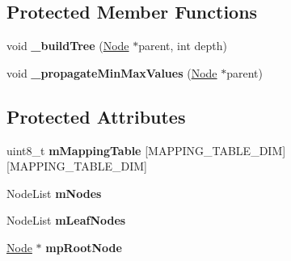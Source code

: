 \subsection*{\-Protected \-Member \-Functions}
\begin{DoxyCompactItemize}
\item 
\hypertarget{class_verdi_1_1_min_max_octree_ab3d01fd03e28cbb9b16deacdafb16175}{void {\bfseries \-\_\-build\-Tree} (\hyperlink{class_verdi_1_1_min_max_octree_1_1_node}{\-Node} $\ast$parent, int depth)}\label{class_verdi_1_1_min_max_octree_ab3d01fd03e28cbb9b16deacdafb16175}

\item 
\hypertarget{class_verdi_1_1_min_max_octree_a988d243c72a8bd249d26e1444fb3ac34}{void {\bfseries \-\_\-propagate\-Min\-Max\-Values} (\hyperlink{class_verdi_1_1_min_max_octree_1_1_node}{\-Node} $\ast$parent)}\label{class_verdi_1_1_min_max_octree_a988d243c72a8bd249d26e1444fb3ac34}

\end{DoxyCompactItemize}
\subsection*{\-Protected \-Attributes}
\begin{DoxyCompactItemize}
\item 
\hypertarget{class_verdi_1_1_min_max_octree_acc576d7e7142cff41ec896960fc8e938}{uint8\-\_\-t {\bfseries m\-Mapping\-Table} \mbox{[}\-M\-A\-P\-P\-I\-N\-G\-\_\-\-T\-A\-B\-L\-E\-\_\-\-D\-I\-M\mbox{]}\mbox{[}\-M\-A\-P\-P\-I\-N\-G\-\_\-\-T\-A\-B\-L\-E\-\_\-\-D\-I\-M\mbox{]}}\label{class_verdi_1_1_min_max_octree_acc576d7e7142cff41ec896960fc8e938}

\item 
\hypertarget{class_verdi_1_1_min_max_octree_ac6d6a97f45fe4af07948c7b5f5eca674}{\-Node\-List {\bfseries m\-Nodes}}\label{class_verdi_1_1_min_max_octree_ac6d6a97f45fe4af07948c7b5f5eca674}

\item 
\hypertarget{class_verdi_1_1_min_max_octree_aae3816cb5486e18fae99440a9603c929}{\-Node\-List {\bfseries m\-Leaf\-Nodes}}\label{class_verdi_1_1_min_max_octree_aae3816cb5486e18fae99440a9603c929}

\item 
\hypertarget{class_verdi_1_1_min_max_octree_aa49717179d4ae4069a29473f6634d2d5}{\hyperlink{class_verdi_1_1_min_max_octree_1_1_node}{\-Node} $\ast$ {\bfseries mp\-Root\-Node}}\label{class_verdi_1_1_min_max_octree_aa49717179d4ae4069a29473f6634d2d5}

\end{DoxyCompactItemize}
